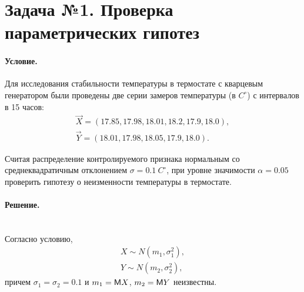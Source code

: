 
\section{Задача №1. Проверка параметрических гипотез}

\paragraph{Условие.} Для исследования стабильности температуры в термостате с кварцевым генератором были проведены две серии замеров температуры (в $C^{\circ}$) с интервалов в 15 часов:
\begin{align*}
\vec{X} = (17.85, 17.98, 18.01, 18.2, 17.9, 18.0), \\
\vec{Y} = (18.01, 17.98, 18.05, 17.9, 18.0).
\end{align*}

Считая распределение контролируемого признака нормальным со среднеквадратичным отклонением $\sigma=0.1~C^{\circ}$, при уровне значимости $\alpha=0.05$ проверить гипотезу о неизменности температуры в термостате.



\paragraph{Решение.}\hfill\\
Согласно условию, 
\begin{align*}
X \sim N(m_1, \sigma_1^2),  \\
Y \sim N(m_2, \sigma_2^2),
\end{align*}
причем $\sigma_1=\sigma_2=0.1$ и $m_1=\mathsf{M} X$, $m_2=\mathsf{M} Y$ неизвестны.

